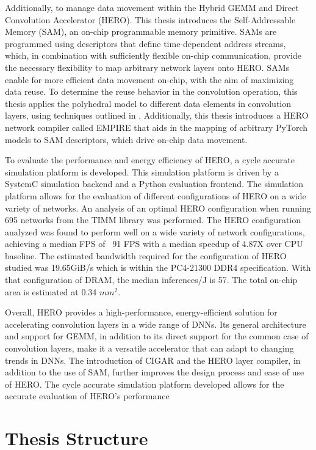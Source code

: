 Additionally, to manage data movement within the Hybrid GEMM and Direct
Convolution Accelerator (HERO). This thesis introduces the Self-Addressable
Memory (SAM), an on-chip programmable memory primitive. SAMs are programmed
using descriptors that define time-dependent address streams, which, in
combination with sufficiently flexible on-chip communication, provide the
necessary flexibility to map arbitrary network layers onto HERO. SAMs enable for
more efficient data movement on-chip, with the aim of maximizing data reuse. To
determine the reuse behavior in the convolution operation, this thesis applies
the polyhedral model to different data elements in convolution layers, using
techniques outlined in \cite{meeus}. Additionally, this thesis introduces a HERO
network compiler called EMPIRE that aids in the mapping of arbitrary PyTorch
models to SAM descriptors, which drive on-chip data movement.


To evaluate the performance and energy efficiency of HERO, a cycle accurate
simulation platform is developed. This simulation platform is driven by a
SystemC simulation backend and a Python evaluation frontend. The simulation
platform allows for the evaluation of different configurations of HERO on a wide
variety of networks. An analysis of an optimal HERO configuration when running
695 networks from the TIMM library was performed. The HERO configuration
analyzed was found to perform well on a wide variety of network configurations,
achieving a median FPS of ~91 FPS with a median speedup of 4.87X over CPU
baseline. The estimated bandwidth required for the configuration of HERO studied
was 19.65GiB/s which is within the PC4-21300 DDR4 specification. With that
configuration of DRAM, the median inferences/J is 57. The total on-chip area is
estimated at 0.34 $mm^2$.


Overall, HERO provides a high-performance, energy-efficient solution for
accelerating convolution layers in a wide range of DNNs. Its general
architecture and support for GEMM, in addition to its direct support for the
common case of convolution layers, make it a versatile accelerator that can
adapt to changing trends in DNNs. The introduction of CIGAR and the HERO layer
compiler, in addition to the use of SAM, further improves the design process and
ease of use of HERO. The cycle accurate simulation platform developed allows for
the accurate evaluation of HERO's performance


\section{Thesis Structure}
\label{chap:intro:thesis_structure}


